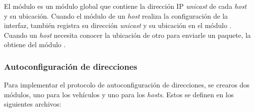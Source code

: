 \begin{sloppypar}
El módulo  es un módulo global que contiene la
dirección IP \textit{unicast} de cada \textit{host} y su ubicación. Cuando el
módulo  de un \textit{host} realiza la
configuración de la interfaz, también registra su dirección \textit{unicast} y
su ubicación en el módulo . Cuando un \textit{host}
necesita conocer la ubicación de otro para enviarle un paquete, la obtiene del
módulo .
\end{sloppypar}

\subsubsection{Autoconfiguración de direcciones}
\label{subsubsec:autoconfiguracion_de_direcciones_sim}

Para implementar el protocolo de autoconfiguración de direcciones, se crearos
dos módulos, uno para los vehículos y uno para los \textit{hosts}. Estos se
definen en los siguientes archivos:

